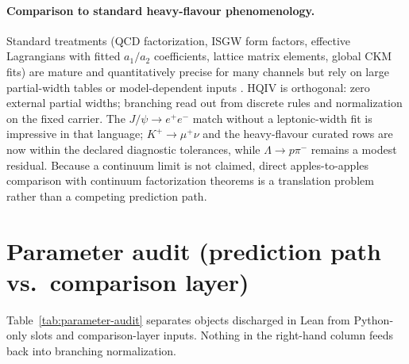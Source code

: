 \documentclass[11pt]{amsart}
\begin{document}
\paragraph{Comparison to standard heavy-flavour phenomenology.}
Standard treatments (QCD factorization, ISGW form factors, effective Lagrangians with
fitted $a_1/a_2$ coefficients, lattice matrix elements, global CKM fits) are mature
and quantitatively precise for many channels but rely on large partial-width tables
or model-dependent inputs \cite{peskin1995,schwartz2014,pdg2024}.
HQIV is orthogonal: zero external partial widths; branching read out from discrete
rules and normalization on the fixed carrier.
The $J/\psi\to e^+e^-$ match without a leptonic-width fit is impressive in that
language; $K^+\to\mu^+\nu$ and the heavy-flavour curated rows are now within the
declared diagnostic tolerances, while $\Lambda\to p\pi^-$ remains a modest residual.
Because a continuum limit is not claimed, direct apples-to-apples comparison with
continuum factorization theorems is a translation problem rather than a competing
prediction path.

\section{Parameter audit (prediction path vs.\ comparison layer)}
\label{sec:parameter-audit}

Table~\ref{tab:parameter-audit} separates objects discharged in Lean from
Python-only slots and comparison-layer inputs.
Nothing in the right-hand column feeds back into branching normalization.
\end{document}
